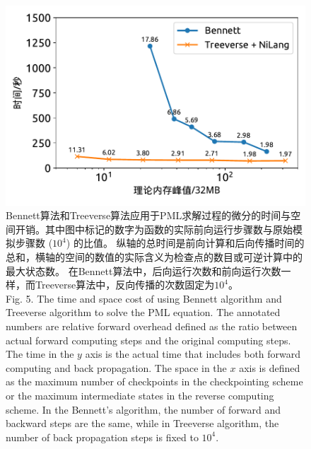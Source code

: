 \documentclass[A4,twoside,UTF8]{ctexart}
\begin{document}
\begin{figure}
\centering
\includegraphics[width=0.6\columnwidth]{./fig5.pdf}
    \caption{Bennett算法和Treeverse算法应用于PML求解过程的微分的时间与空间开销。其中图中标记的数字为函数的实际前向运行步骤数与原始模拟步骤数 ($10^4$) 的比值。
    纵轴的总时间是前向计算和后向传播时间的总和，横轴的空间的数值的实际含义为检查点的数目或可逆计算中的最大状态数。
    在Bennett算法中，后向运行次数和前向运行次数一样，而Treeverse算法中，反向传播的次数固定为$10^4$。\\
    Fig. 5. The time and space cost of using Bennett algorithm and Treeverse algorithm to solve the PML equation.
    The annotated numbers are relative forward overhead defined as the ratio between actual forward computing steps and the original computing steps.
    The time in the $y$ axis is the actual time that includes both forward computing and back propagation. The space in the $x$ axis is defined as the maximum number of checkpoints in the checkpointing scheme or the maximum intermediate states in the reverse computing scheme.
    In the Bennett's algorithm, the number of forward and backward steps are the same, while in Treeverse algorithm, the number of back propagation steps is fixed to $10^4$.
    }
    \label{fig:seismic}
\end{figure}
\end{document}
